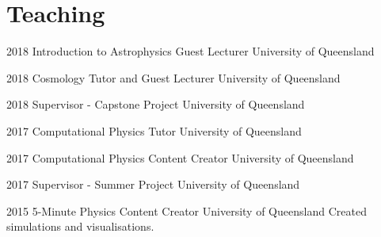 \documentclass[]{friggeri-cv} %
\begin{document}
\section{Teaching}
\begin{entrylist}
	\entryInlineSmall
	{2018}
	{Introduction to Astrophysics Guest Lecturer}
	{University of Queensland}
	{}
\end{entrylist}
\begin{entrylist}
	\entryInlineSmall
	{2018}
	{Cosmology Tutor and Guest Lecturer}
	{University of Queensland}
	{}
\end{entrylist}
\begin{entrylist}
	\entryInlineSmall
	{2018}
	{Supervisor - Capstone Project}
	{University of Queensland}
	{}
\end{entrylist}
\begin{entrylist}
	\entryInlineSmall
	{2017}
	{Computational Physics Tutor}
	{University of Queensland}
	{}
\end{entrylist}
\begin{entrylist}
	\entryInlineSmall
	{2017}
	{Computational Physics Content Creator}
	{University of Queensland}
	{}
\end{entrylist}
\begin{entrylist}
	\entryInlineSmall
	{2017}
	{Supervisor - Summer Project}
	{University of Queensland}
	{}
\end{entrylist}
\begin{entrylist}
	\entryInline
	{2015}
	{5-Minute Physics Content Creator}
	{University of Queensland}
	{Created simulations and visualisations.}
\end{entrylist}
\end{document}

